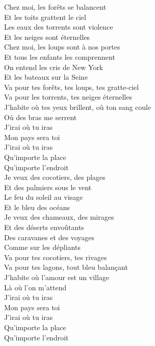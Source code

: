 \documentclass{novel}
\begin{document}
\begin{multicols}{2}
Chez moi, les forêts se balancent \\
Et les toits grattent le ciel \\
Les eaux des torrents sont violence \\
Et les neiges sont éternelles \\
Chez moi, les loups sont à nos portes \\
Et tous les enfants les comprennent \\
On entend les cris de New York \\
Et les bateaux sur la Seine \\

Va pour tes forêts, tes loups, tes gratte-ciel \\
Va pour les torrents, tes neiges éternelles \\
J'habite où tes yeux brillent, où ton sang coule \\
Où des bras me serrent \\

J'irai où tu iras \\
Mon pays sera toi \\
J'irai où tu iras \\
Qu'importe la place \\
Qu'importe l'endroit \\

Je veux des cocotiers, des plages \\
Et des palmiers sous le vent \\
Le feu du soleil au visage \\
Et le bleu des océans \\
Je veux des chameaux, des mirages \\
Et des déserts envoûtants \\
Des caravanes et des voyages \\
Comme sur les dépliants \\

Va pour tes cocotiers, tes rivages \\
Va pour tes lagons, tout bleu balançant \\
J'habite où l'amour est un village \\
Là où l'on m'attend \\
J'irai où tu iras \\
Mon pays sera toi \\

J'irai où tu iras \\
Qu'importe la place \\
Qu'importe l'endroit \\


\end{multicols}
\end{document}
